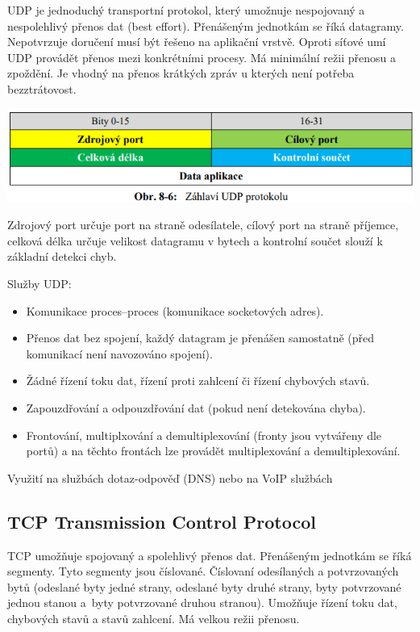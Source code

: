 UDP je jednoduchý transportní protokol, který umožnuje nespojovaný a nespolehlivý přenos dat (best effort). Přenášeným jednotkám se říká datagramy. Nepotvrzuje doručení musí být řešeno na aplikační vrstvě. Oproti síťové umí UDP provádět přenos mezi konkrétními procesy. Má minimální režii přenosu a zpoždění. Je vhodný na přenos krátkých zpráv u kterých není potřeba bezztrátovost. 

\begin{center}
\includegraphics[scale = 0.5]{images/-050.png}
\end{center}

Zdrojový port určuje port na straně odesílatele, cílový port na straně příjemce, celková délka určuje velikost datagramu v bytech a kontrolní součet slouží k základní detekci chyb.

Služby UDP:
\begin{itemize}[noitemsep]
    \item Komunikace proces--proces (komunikace socketových adres).
    \item Přenos dat bez spojení, každý datagram je přenášen samostatně (před komunikací není navozováno spojení).
    \item Žádné řízení toku dat, řízení proti zahlcení či řízení chybových stavů.
    \item Zapouzdřování a odpouzdřování dat (pokud není detekována chyba).
    \item Frontování, multiplxování a demultiplexování (fronty jsou vytvářeny dle portů) a na těchto frontách lze provádět multiplexování a demultiplexování.
\end{itemize}

Využití na službách dotaz-odpověď (DNS) nebo na VoIP službách

\subsection{TCP Transmission Control Protocol}

TCP umožňuje spojovaný a spolehlivý přenos dat. Přenášeným jednotkám se říká segmenty. Tyto segmenty jsou číslované. Číslovaní odesílaných a potvrzovaných bytů (odeslané byty jedné strany, odeslané byty druhé strany, byty potvrzované jednou stanou a~byty potvrzované druhou stranou). Umožňuje řízení toku dat, chybových stavů a stavů zahlcení. Má velkou režii přenosu.


